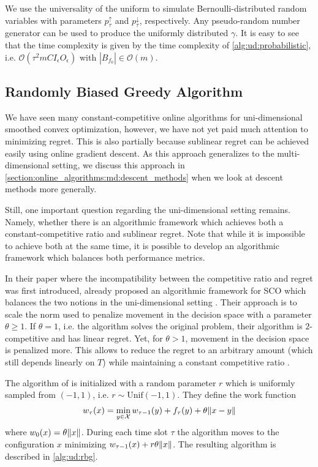 We use the universality of the uniform to simulate Bernoulli-distributed random variables with parameters $p_{\tau}^{\uparrow}$ and $p_{\tau}^{\downarrow}$, respectively. Any pseudo-random number generator can be used to produce the uniformly distributed $\gamma$. It is easy to see that the time complexity is given by the time complexity of \autoref{alg:ud:probabilistic}, i.e. $\mathcal{O}(\tau^2 m C I_{\epsilon} O_{\epsilon})$ with $|B_{f_0}| \in \mathcal{O}(m)$.

\subsection{Randomly Biased Greedy Algorithm}

We have seen many constant-competitive online algorithms for uni-dimensional smoothed convex optimization, however, we have not yet paid much attention to minimizing regret. This is also partially because sublinear regret can be achieved easily using online gradient descent. As this approach generalizes to the multi-dimensional setting, we discuss this approach in \autoref{section:online_algorithms:md:descent_methods} when we look at descent methods more generally.

Still, one important question regarding the uni-dimensional setting remains. Namely, whether there is an algorithmic framework which achieves both a constant-competitive ratio and sublinear regret. Note that while it is impossible to achieve both at the same time, it is possible to develop an algorithmic framework which balances both performance metrics.

In their paper where the incompatibility between the competitive ratio and regret was first introduced, \citeauthor*{Andrew2015} already proposed an algorithmic framework for SCO which balances the two notions in the uni-dimensional setting \cite{Andrew2015}. Their approach is to scale the norm used to penalize movement in the decision space with a parameter $\theta \geq 1$. If $\theta = 1$, i.e. the algorithm solves the original problem, their algorithm is $2$-competitive and has linear regret. Yet, for $\theta > 1$, movement in the decision space is penalized more. This allows to reduce the regret to an arbitrary amount (which still depends linearly on $T$) while maintaining a constant competitive ratio \cite{Andrew2015}.

The algorithm of \citeauthor*{Andrew2015} is initialized with a random parameter $r$ which is uniformly sampled from $({-1,1})$, i.e. $r \sim \text{Unif}(-1, 1)$. They define the work function \begin{align}\label{eq:randomly_biased_greedy:work_function}
    w_{\tau}(x) = \min_{y \in \mathcal{X}} w_{\tau-1}(y) + f_{\tau}(y) + \theta \lVert x - y\rVert
\end{align} where $w_0(x) = \theta \lVert x\rVert$. During each time slot $\tau$ the algorithm moves to the configuration $x$ minimizing $w_{\tau-1}(x) + r \theta \lVert x\rVert$. The resulting algorithm is described in \autoref{alg:ud:rbg}.

